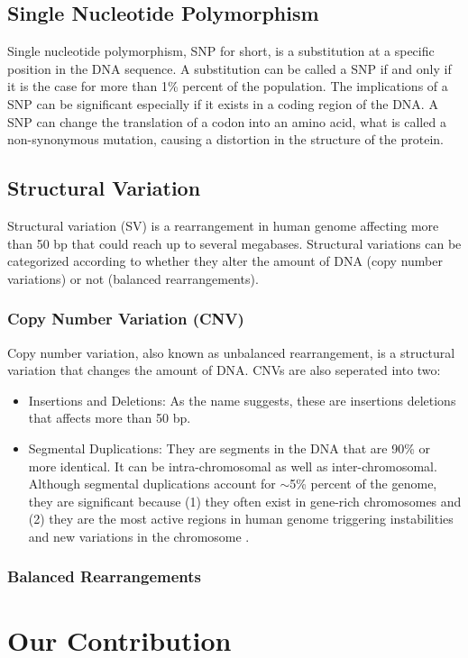 \subsection{Single Nucleotide Polymorphism}
Single nucleotide polymorphism, SNP for short, is a substitution at a specific position in the DNA sequence. A substitution can be called a SNP if and only if it is the case for more than 1\% percent of the population. The implications of a SNP can be significant especially if it exists in a coding region of the DNA. A SNP can change the translation of a codon into an amino acid, what is called a non-synonymous mutation, causing a distortion in the structure of the protein. 


\subsection{Structural Variation}
Structural variation (SV) is a rearrangement in human genome affecting more than 50 bp that could reach up to several megabases. Structural variations can be categorized according to whether they alter the amount of DNA (copy number variations) or not (balanced rearrangements). 

\subsubsection{Copy Number Variation (CNV)}
Copy number variation, also known as unbalanced rearrangement, is a structural variation that changes the amount of DNA. CNVs are also seperated into two:
\begin{itemize}
  \item Insertions and Deletions: As the name suggests, these are insertions deletions that affects more than 50 bp.
  \item Segmental Duplications: They are segments in the DNA that are 90\% or more identical. It can be intra-chromosomal as well as inter-chromosomal. Although segmental duplications account for $\sim$5\% percent of the genome, they are significant because (1) they often exist in gene-rich chromosomes \cite{bailey2002recent} and (2) they are the most active regions in human genome triggering instabilities and new variations in the chromosome \cite{samonte2002segmental,sudmant2010diversity}.
\end{itemize}
\subsubsection{Balanced Rearrangements}

\section{Our Contribution}
\newpage
